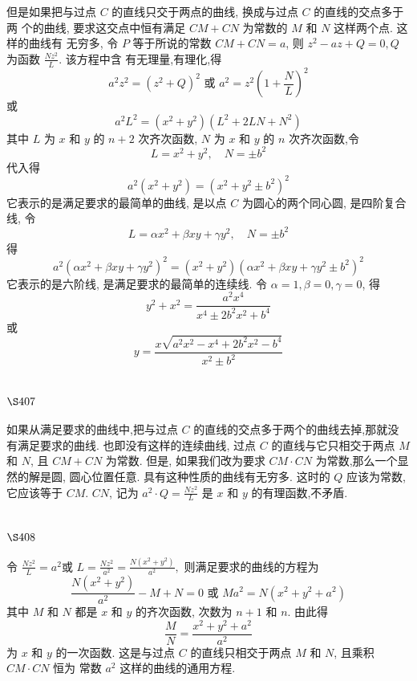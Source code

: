 但是如果把与过点 $C$ 的直线只交于两点的曲线, 换成与过点 $C$ 的直线的交点多于两 个的曲线, 要求这交点中恒有满足 $C M+C N$ 为常数的 $M$ 和 $N$ 这样两个点. 这样的曲线有 无穷多, 令 $P$ 等于所说的常数 $C M+C N=a$, 则 $z^{2}-a z+Q=0, Q$ 为函数 $\frac{N z^{2}}{L}$. 该方程中含 有无理量,有理化,得
\[
a^{2} z^{2}=\left(z^{2}+Q\right)^{2} \text { 或 } a^{2}=z^{2}\left(1+\frac{N}{L}\right)^{2}
\]
或
\[
a^{2} L^{2}=\left(x^{2}+y^{2}\right)\left(L^{2}+2 L N+N^{2}\right)
\]
其中 $L$ 为 $x$ 和 $y$ 的 $n+2$ 次齐次函数, $N$ 为 $x$ 和 $y$ 的 $n$ 次齐次函数,令
\[
L=x^{2}+y^{2}, \quad N=\pm b^{2}
\]
代入得
\[
a^{2}\left(x^{2}+y^{2}\right)=\left(x^{2}+y^{2} \pm b^{2}\right)^{2}
\]
它表示的是满足要求的最简单的曲线, 是以点 $C$ 为圆心的两个同心圆, 是四阶复合线, 令
\[
L=\alpha x^{2}+\beta x y+\gamma y^{2}, \quad N=\pm b^{2}
\]
得
\[
a^{2}\left(\alpha x^{2}+\beta x y+\gamma y^{2}\right)^{2}=\left(x^{2}+y^{2}\right)\left(\alpha x^{2}+\beta x y+\gamma y^{2} \pm b^{2}\right)^{2}
\]
它表示的是六阶线, 是满足要求的最简单的连续线. 令 $\alpha=1, \beta=0, \gamma=0$, 得
\[
y^{2}+x^{2}=\frac{a^{2} x^{4}}{x^{4} \pm 2 b^{2} x^{2}+b^{4}}
\]
或
\[
y=\frac{x \sqrt{a^{2} x^{2}-x^{4}+2 b^{2} x^{2}-b^{4}}}{x^{2} \pm b^{2}}
\]
\section{$\S 407$}

如果从满足要求的曲线中,把与过点 $C$ 的直线的交点多于两个的曲线去掉,那就没 有满足要求的曲线. 也即没有这样的连续曲线, 过点 $C$ 的直线与它只相交于两点 $M$ 和 $N$, 且 $C M+C N$ 为常数. 但是, 如果我们改为要求 $C M \cdot C N$ 为常数,那么一个显然的解是圆, 圆心位置任意. 具有这种性质的曲线有无穷多. 这时的 $Q$ 应该为常数, 它应该等于 $C M$. $C N$, 记为 $a^{2} \cdot Q=\frac{N z^{2}}{L}$ 是 $x$ 和 $y$ 的有理函数,不矛盾.

\section{$\S 408$}

令 $ \frac{N z^{2}}{L}=a^{2} $或 $ L=\frac{N z^{2}}{a^{2}}=\frac{N\left(x^{2}+y^{2}\right)}{a^{2}}, $ 则满足要求的曲线的方程为 
\[
\frac{N\left(x^{2}+y^{2}\right)}{a^{2}}-M+N=0 \text { 或 } M a^{2}=N\left(x^{2}+y^{2}+a^{2}\right)
\]
其中 $M$ 和 $N$ 都是 $x$ 和 $y$ 的齐次函数, 次数为 $n+1$ 和 $n$. 由此得
\[
\frac{M}{N}=\frac{x^{2}+y^{2}+a^{2}}{a^{2}}
\]
为 $x$ 和 $y$ 的一次函数. 这是与过点 $C$ 的直线只相交于两点 $M$ 和 $N$, 且乘积 $C M \cdot C N$ 恒为 常数 $a^{2}$ 这样的曲线的通用方程.

